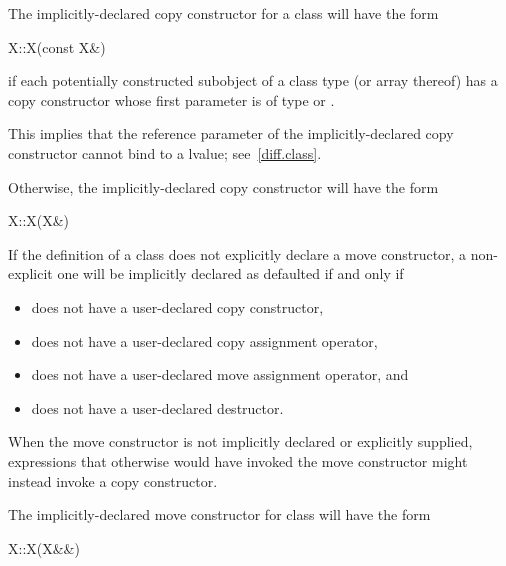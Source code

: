 \pnum
The implicitly-declared copy constructor for a class
will have the form
\begin{codeblock}
X::X(const X&)
\end{codeblock}
if each potentially constructed subobject of a class type
(or array thereof)
has a copy constructor whose first parameter is of type
or
.
\begin{footnote}
This implies that the reference parameter of the
implicitly-declared copy constructor
cannot bind to a
lvalue; see~\ref{diff.class}.
\end{footnote}
Otherwise, the implicitly-declared copy constructor will have the form
\begin{codeblock}
X::X(X&)
\end{codeblock}

\pnum
{}%
If the definition of a class  does not explicitly declare
a move constructor, a non-explicit one will be
implicitly declared as defaulted if and only if
\begin{itemize}
\item
{} does not have a user-declared copy constructor,

\item
{} does not have a user-declared copy assignment operator,

\item
{} does not have a user-declared move assignment operator, and

\item
{} does not have a user-declared destructor.
\end{itemize}

\begin{note}
When the move constructor is not implicitly declared or explicitly supplied,
expressions that otherwise would have invoked the move constructor might instead invoke
a copy constructor.
\end{note}

\pnum
The implicitly-declared move constructor for class  will have the form
\begin{codeblock}
X::X(X&&)
\end{codeblock}

